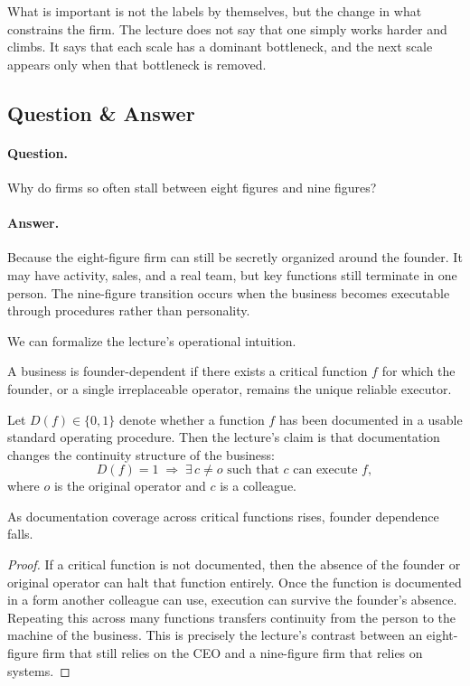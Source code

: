 What is important is not the labels by themselves, but the change in what constrains the firm. The lecture does not say that one simply works harder and climbs. It says that each scale has a dominant bottleneck, and the next scale appears only when that bottleneck is removed.

\subsection{Question \& Answer}

\paragraph{Question.} Why do firms so often stall between eight figures and nine figures?

\paragraph{Answer.} Because the eight-figure firm can still be secretly organized around the founder. It may have activity, sales, and a real team, but key functions still terminate in one person. The nine-figure transition occurs when the business becomes executable through procedures rather than personality.

We can formalize the lecture's operational intuition.

\begin{definition}
A business is founder-dependent if there exists a critical function \(f\) for which the founder, or a single irreplaceable operator, remains the unique reliable executor.
\end{definition}

Let \(D(f)\in\{0,1\}\) denote whether a function \(f\) has been documented in a usable standard operating procedure. Then the lecture's claim is that documentation changes the continuity structure of the business:
\begin{equation}
D(f)=1 \;\Rightarrow\; \exists\,c\neq o \text{ such that } c \text{ can execute } f,
\end{equation}
where \(o\) is the original operator and \(c\) is a colleague.

\begin{proposition}
As documentation coverage across critical functions rises, founder dependence falls.
\end{proposition}

\begin{proof}
If a critical function is not documented, then the absence of the founder or original operator can halt that function entirely. Once the function is documented in a form another colleague can use, execution can survive the founder's absence. Repeating this across many functions transfers continuity from the person to the machine of the business. This is precisely the lecture's contrast between an eight-figure firm that still relies on the CEO and a nine-figure firm that relies on systems.
\end{proof}

